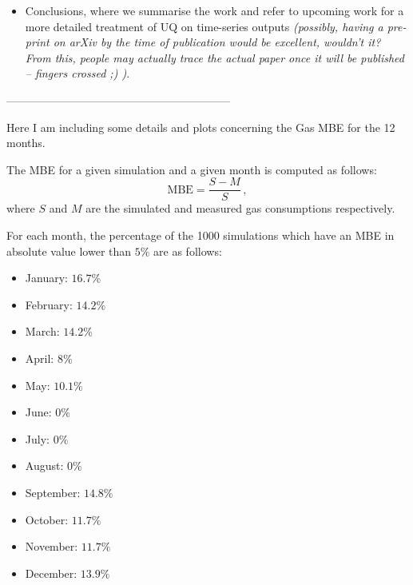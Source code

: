 \documentclass[a4paper, 12pt]{article}
\begin{document}
\begin{itemize}[leftmargin=*]
\item Conclusions, where we summarise the work and refer to upcoming work for a more detailed treatment of UQ on time-series outputs \emph{(possibly, having a pre-print on arXiv by the time of publication would be excellent, wouldn't it? From this, people may actually trace the actual paper once it will be published -- fingers crossed ;) )}.
\end{itemize}
\vspace{3ex}

------------------------------------------------------------
\vspace{5ex}


Here I am including some details and plots concerning the Gas MBE for the 12 months.
\vspace{2ex}

The MBE for a given simulation and a given month is computed as follows:
$$
\text{MBE} = \frac{S-M}{S}\,,
$$
where $S$ and $M$ are the simulated and measured gas consumptions respectively.

For each month, the percentage of the 1000 simulations which have an MBE in absolute value lower than $5\%$ are as follows:
\begin{itemize}
\item January: $16.7\%$
\item February: $14.2\%$ 
\item March: $14.2\%$
\item April: $8\%$
\item May: $10.1\%$
\item June: $0\%$
\item July: $0\%$
\item August: $0\%$
\item September: $14.8\%$
\item October: $11.7\%$
\item November: $11.7\%$
\item December: $13.9\%$
\end{itemize}
\end{document}
